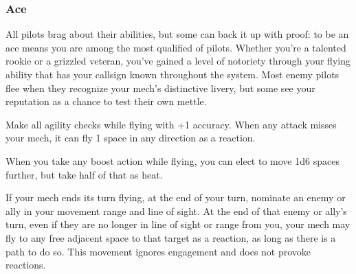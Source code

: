 \subsubsection{Ace}

\begin{talent}
{All pilots brag about their abilities, but some can back it up with proof: to be an ace means you are among
the most qualified of pilots. Whether you’re a talented rookie or a grizzled veteran, you’ve gained a level of
notoriety through your flying ability that has your callsign known throughout the system. Most enemy pilots
flee when they recognize your mech’s distinctive livery, but some see your reputation as a chance to test
their own mettle.}

Make all agility checks while flying with +1 accuracy. When any attack
misses your mech, it can fly 1 space in any direction as a reaction.

When you take any boost action while flying, you can elect to move 1d6
spaces further, but take half of that as heat.

If your mech ends its turn flying, at the end of your turn, nominate an
enemy or ally in your movement range and line of sight. At the end of that enemy or ally’s turn,
even if they are no longer in line of sight or range from you, your mech may fly to any free
adjacent space to that target as a reaction, as long as there is a path to do so. This movement
ignores engagement and does not provoke reactions.

\end{talent}